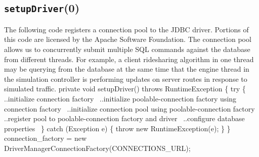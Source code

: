 \documentclass{article}
\def\nwendcode{\endtrivlist \endgroup}      %
\let\nwdocspar=\par
\theoremstyle{definition}                   %
\begin{document}
\subsection{{\tt{}\protect{}setupDriver}(0)}
The following code registers a connection pool to the JDBC driver.  Portions of
this code are licensed by the Apache Software Foundation.  The connection pool
allows us to concurrently submit multiple SQL commands against the database
from different threads. For example, a client ridesharing algorithm in one
thread may be querying from the database at the same time that the engine
thread in the simulation controller is performing updates on server routes
in response to simulated traffic.
\nwenddocs{}\endmoddef{}
private void setupDriver() throws RuntimeException \{
  try \{
    \LA{}..initialize connection factory~{\nwtagstyle{}}\RA{}
    \LA{}..initialize poolable-connection factory using connection factory~{\nwtagstyle{}}\RA{}
    \LA{}..initialize connection pool using poolable-connection factory~{\nwtagstyle{}}\RA{}
    \LA{}..register pool to poolable-connection factory and driver~{\nwtagstyle{}}\RA{}
    \LA{}..configure database properties~{\nwtagstyle{}}\RA{}
  \} catch (Exception e) \{
    throw new RuntimeException(e);
  \}
\}
\eatline
{}\nwendcode{}\endmoddef{}
connection_factory = new DriverManagerConnectionFactory(CONNECTIONS_URL);
\nwendcode{}\nwdocspar
\nwenddocs{}\endmoddef{}
\end{document}

